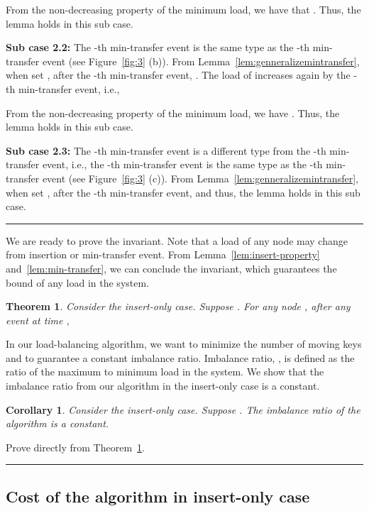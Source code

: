 \documentclass[a4paper]{article}
\newtheorem{theorem}{Theorem}
\newtheorem{corollary}{Corollary}
\newenvironment{proof}{{\bf Proof:}}{\hfill\rule{1.5mm}{3mm}\vspace{0.1in}}
\begin{document}
\begin{proof}
  From the non-decreasing property of the minimum load, we have that . Thus, the lemma
  holds in this sub case.

  \textbf{Sub case 2.2:} The -th min-transfer event is the same
  type as the -th min-transfer event (see Figure~\ref{fig:3} (b)).
  From Lemma~\ref{lem:genneralizemintransfer}, when set , after the
  -th min-transfer event, . The load of   increases again by the
  -th min-transfer event, i.e.,
  
   From the non-decreasing property of the minimum load,
  we have .  Thus,
  the lemma holds in this sub case.

  \textbf{Sub case 2.3:} The -th min-transfer event is a
  different type from the -th min-transfer event, i.e., the
  -th min-transfer event is the same type as the -th
  min-transfer event (see Figure~\ref{fig:3} (c)). From
  Lemma~\ref{lem:genneralizemintransfer}, when set ,  
  after the -th min-transfer event,  and thus, the lemma holds in this sub case.
\end{proof}

We are ready to prove the invariant. Note that a load of any node
may change from insertion or min-transfer event.  From
Lemma~\ref{lem:insert-property} and~\ref{lem:min-transfer}, we can
conclude the invariant, which guarantees the bound of any load in the
system.

\begin{theorem}\label{thm:maxload}
  Consider the insert-only case. Suppose . For any node , after any event at time
  , 
\end{theorem}
	
In our load-balancing algorithm, we want to minimize the number of
moving keys and to guarantee a constant imbalance ratio.  Imbalance
ratio, , is defined as the ratio of the maximum to minimum
load in the system. We show that the imbalance ratio from our
algorithm in the insert-only case is a constant.

\begin{corollary}\label{thm:Imbalance_ratio}
  Consider the insert-only case. Suppose . The imbalance ratio of the algorithm is a constant.
\end{corollary}

\begin{proof}
  Prove directly from Theorem~\ref{thm:maxload}.
\end{proof}

\subsection{Cost of the algorithm in insert-only case}
\label{sect:imbalanceratioproof}
\end{document}

